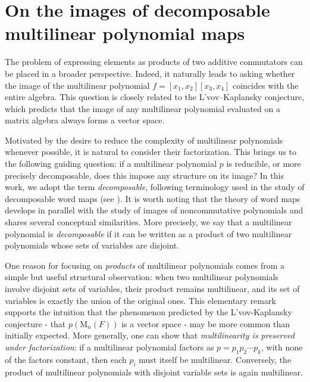 \documentclass[11pt]{article}
\theoremstyle{definition}
\begin{document}
{{{{				\section{On the images of decomposable multilinear polynomial maps}
				
				The problem of expressing elements as products of two additive commutators can be placed in a broader perspective. Indeed, it naturally leads to asking whether the image of the multilinear polynomial $f = [x_1, x_2][x_3, x_4]$
				coincides with the entire algebra. This question is closely related to the L’vov--Kaplansky conjecture, which predicts that the image of any multilinear polynomial evaluated on a matrix algebra always forms a vector space.
				
				Motivated by the desire to reduce the complexity of multilinear polynomials whenever possible, it is natural to consider their factorization. This brings us to the following guiding question: if a multilinear polynomial \( p \) is reducible, or more precisely decomposable, does this impose any structure on its image? In this work, we adopt the term \textit{decomposable}, following terminology used in the study of decomposable word maps (see \cite[Page 610]{Pa_Gnu_20}). It is worth noting that the theory of word maps develops in parallel with the study of images of noncommutative polynomials and shares several conceptual similarities. More precisely, we say that a multilinear polynomial is \textit{decomposable} if it can be written as a product of two multilinear polynomials whose sets of variables are disjoint.
				
				One reason for focusing on \textit{products} of multilinear polynomials comes from a simple but useful structural observation: when two multilinear polynomials involve disjoint sets of variables, their product remains multilinear, and its set of variables is exactly the union of the original ones. This elementary remark supports the intuition that the phenomenon predicted by the L’vov-Kaplansky conjecture - that \( p(\mathrm{M}_n(F)) \) is a vector space - may be more common than initially expected. More generally, one can show that \textit{multilinearity is preserved under factorization}: if a multilinear polynomial factors as \( p = p_1 p_2 \cdots p_k \), with none of the factors constant, then each \( p_i \) must itself be multilinear. Conversely, the product of multilinear polynomials with disjoint variable sets is again multilinear.
				
}}}}
\end{document}
